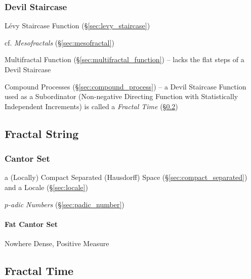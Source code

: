 \subsubsection{Devil Staircase}\label{sec:devil_staircase}

L\'evy Staircase Function (\S\ref{sec:levy_staircase})

cf. \emph{Mesofractals} (\S\ref{sec:mesofractal})

\fist Multifractal Function (\S\ref{sec:multifractal_function}) -- lacks the
flat steps of a Devil Staircase

Compound Processes (\S\ref{sec:compound_process}) -- a Devil Staircase Function
used as a Subordinator (Non-negative Directing Function with Statistically
Independent Increments) is called a \emph{Fractal Time}
(\S\ref{sec:fractal_time})



\subsection{Fractal String}\label{sec:fractal_string}

\subsubsection{Cantor Set}\label{sec:cantor_set}

a (Locally) Compact Separated (Hausdorff) Space (\S\ref{sec:compact_separated})
and a Locale (\S\ref{sec:locale})

\emph{$p$-adic Numbers} (\S\ref{sec:padic_number})



\paragraph{Fat Cantor Set}\label{sec:fat_cantor_set}\hfill

Nowhere Dense, Positive Measure



\subsection{Fractal Time}\label{sec:fractal_time}

